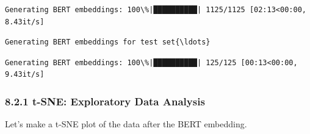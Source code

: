 \documentclass[11pt]{article}
\begin{document}
    \begin{Verbatim}[commandchars=\\\{\}]
Generating BERT embeddings: 100\%|██████████| 1125/1125 [02:13<00:00,  8.43it/s]
    \end{Verbatim}

    \begin{Verbatim}[commandchars=\\\{\}]
Generating BERT embeddings for test set{\ldots}
    \end{Verbatim}

    \begin{Verbatim}[commandchars=\\\{\}]
Generating BERT embeddings: 100\%|██████████| 125/125 [00:13<00:00,  9.43it/s]
    \end{Verbatim}

    \subsubsection{8.2.1 t-SNE: Exploratory Data
Analysis}\label{t-sne-exploratory-data-analysis}

Let's make a t-SNE plot of the data after the BERT embedding.
\end{document}
